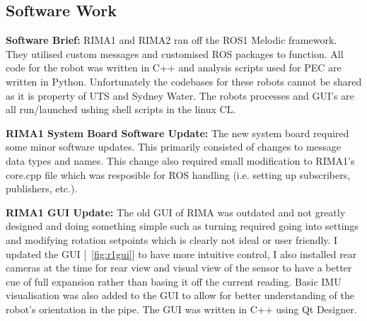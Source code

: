 \newpage
\subsection{Software Work}

\textbf{Software Brief: }
RIMA1 and RIMA2 ran off the ROS1 Melodic framework. They utilised custom messages and customised ROS packages to function. All code for the robot was written in C++ and analysis scripts used for PEC are written
in Python. Unfortunately the codebases for these robots cannot be shared as it is property of UTS and Sydney Water. The robots processes and GUI's are all run/launched ushing shell scripts in the linux CL.

\vspace{\baselineskip}
\textbf{RIMA1 System Board Software Update: }
The new system board required some minor software updates. This primarily consisted of changes to message data types and names. This change also required small modification to RIMA1's core.cpp file which was resposible 
for ROS handling (i.e. setting up subscribers, publishers, etc.). 

\vspace{\baselineskip}
\textbf{RIMA1 GUI Update: }
The old GUI of RIMA was outdated and not greatly designed and doing something simple such as turning required going into settings and modifying rotation setpoints which is clearly not ideal or user friendly. I updated
the GUI [~\ref{fig:r1gui}] to have more intuitive control, I also installed rear cameras at the time for rear view and visual view of the sensor to have a better cue of full expansion rather than basing it off the current reading. Basic 
IMU visualisation was also added to the GUI to allow for better understanding of the robot's orientation in the pipe. The GUI was written in C++ using Qt Designer.

